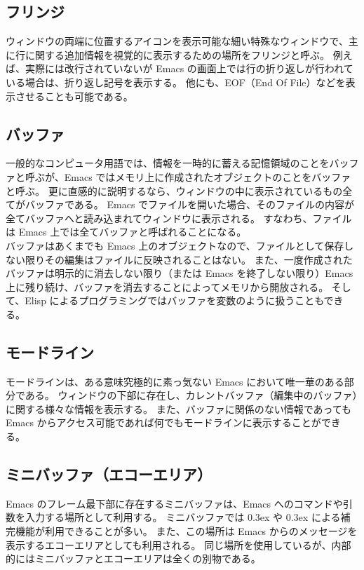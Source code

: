 \subsection{フリンジ}
ウィンドウの両端に位置するアイコンを表示可能な細い特殊なウィンドウで、主に行に関する追加情報を視覚的に表示するための場所をフリンジと呼ぶ。
例えば、実際には改行されていないが Emacs の画面上では行の折り返しが行われている場合は、折り返し記号を表示する。
他にも、EOF（End Of File）などを表示させることも可能である。
\subsection{バッファ}
一般的なコンピュータ用語では、情報を一時的に蓄える記憶領域のことをバッファと呼ぶが、Emacs ではメモリ上に作成されたオブジェクトのことをバッファと呼ぶ。
更に直感的に説明するなら、ウィンドウの中に表示されているもの全てがバッファである。
Emacs でファイルを開いた場合、そのファイルの内容が全てバッファへと読み込まれてウィンドウに表示される。
すなわち、ファイルは Emacs 上では全てバッファと呼ばれることになる。\\

バッファはあくまでも Emacs 上のオブジェクトなので、ファイルとして保存しない限りその編集はファイルに反映されることはない。
また、一度作成されたバッファは明示的に消去しない限り（または Emacs を終了しない限り）Emacs 上に残り続け、バッファを消去することによってメモリから開放される。
そして、Elisp によるプログラミングではバッファを変数のように扱うこともできる。
\subsection{モードライン}
モードラインは、ある意味究極的に素っ気ない Emacs において唯一華のある部分である。
ウィンドウの下部に存在し、カレントバッファ（編集中のバッファ）に関する様々な情報を表示する。
また、バッファに関係のない情報であっても Emacs からアクセス可能であれば何でもモードラインに表示することができる。
\subsection{ミニバッファ（エコーエリア）}
Emacs のフレーム最下部に存在するミニバッファは、Emacs へのコマンドや引数を入力する場所として利用する。
ミニバッファでは \raise0.3ex\hbox{} や \raise0.3ex\hbox{} による補完機能が利用できることが多い。
また、この場所は Emacs からのメッセージを表示するエコーエリアとしても利用される。
同じ場所を使用しているが、内部的にはミニバッファとエコーエリアは全くの別物である。
